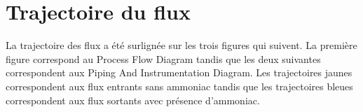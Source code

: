 \newpage
\section{Trajectoire du flux}
\label{sec:trajectoire}
La trajectoire des flux a été surlignée sur les trois figures
qui suivent. La première figure correspond au Process Flow Diagram
tandis que les deux suivantes correspondent aux Piping And Instrumentation Diagram.
Les trajectoires jaunes correspondent aux flux entrants sans ammoniac
tandis que les trajectoires bleues correspondent aux flux sortants
avec présence d'ammoniac.

\begin{figure}[htb!]
	\centering
	\label{pdf1}
\end{figure}
\newpage

\begin{figure}[htb!]
	\centering
	\label{pid1}
\end{figure}
\newpage

